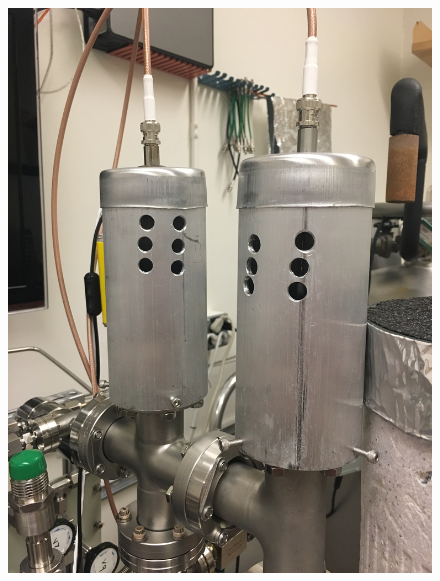 \begin{figure}[htbp]
\begin{minipage}{0.33\textwidth}
    \includegraphics[width=\linewidth, angle=270]{figures/testbed/ft6_6.jpg}
    \end{minipage}

    \vspace*{1cm} %


\end{figure}
